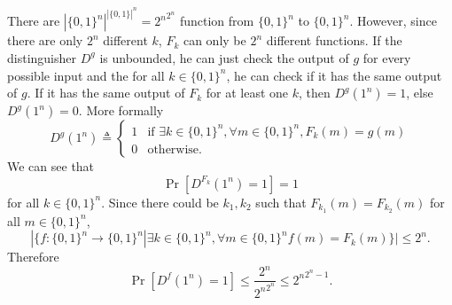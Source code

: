 \subsection{}
\begin{solution}
  There are $|\{0,1\}^n|^{|\{0,1\}|^n} = {2^n}^{2^n}$ function from $\{0,1\}^n$ to $\{0,1\}^n$.
  However, since there are only $2^n$ different $k$, $F_k$ can only be $2^n$ different functions.
  If the distinguisher $D^g$ is unbounded, he can just check the output of $g$ for every possible input and
  the for all $k \in \{0,1\}^n$, he can check if it has the same output of $g$.
  If it has the same output of $F_k$ for at least one $k$, then $D^g(1^n) = 1$, else $D^g(1^n) = 0$.
  More formally
  \[
    D^g(1^n) \triangleq
    \begin{cases}
      1 & \text{if }\exists k \in \{0,1\}^n, \forall m \in \{0,1\}^n, F_k(m) = g(m)\\
      0 & \text{otherwise.}
    \end{cases}
  \]
  We can see that
  \[ \Pr[D^{F_k}(1^n) = 1] = 1 \]
  for all $k \in \{0,1\}^n$.
  Since there could be $k_1,k_2$ such that $F_{k_1}(m) = F_{k_2}(m)$ for all $m \in \{0,1\}^n$,
  \[ |\{f : \{0,1\}^n \to \{0,1\}^n | \exists k \in \{0,1\}^n, \forall m \in \{0,1\}^n f(m) = F_k(m) \}| \leq 2^n. \]
  Therefore
  \[ \Pr[D^{f}(1^n) = 1] \leq \frac{2^n}{{2^n}^{2^n}} \leq {2^n}^{2^n-1}. \]
\end{solution}
